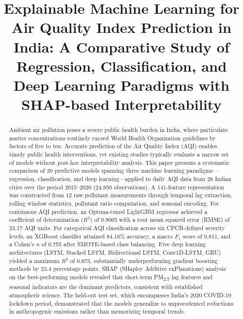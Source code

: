 \documentclass[conference]{IEEEtran}
\begin{document}
\title{Explainable Machine Learning for Air Quality Index Prediction in India: A Comparative Study of Regression, Classification, and Deep Learning Paradigms with SHAP-based Interpretability}

\author{
}

\maketitle

\begin{abstract}
Ambient air pollution poses a severe public health burden in India, where particulate matter concentrations routinely exceed World Health Organization guidelines by factors of five to ten. Accurate prediction of the Air Quality Index (AQI) enables timely public health interventions, yet existing studies typically evaluate a narrow set of models without post-hoc interpretability analysis. This paper presents a systematic comparison of 20 predictive models spanning three machine learning paradigms---regression, classification, and deep learning---applied to daily AQI data from 26 Indian cities over the period 2015--2020 (24,850 observations). A 141-feature representation was constructed from 12 raw pollutant measurements through temporal lag extraction, rolling window statistics, pollutant ratio computation, and seasonal encoding. For continuous AQI prediction, an Optuna-tuned LightGBM regressor achieved a coefficient of determination ($R^2$) of 0.9065 with a root mean squared error (RMSE) of 23.17 AQI units. For categorical AQI classification across six CPCB-defined severity levels, an XGBoost classifier attained 84.16\% accuracy, a macro $F_1$ score of 0.811, and a Cohen's $\kappa$ of 0.755 after SMOTE-based class balancing. Five deep learning architectures (LSTM, Stacked LSTM, Bidirectional LSTM, Conv1D-LSTM, GRU) yielded a maximum $R^2$ of 0.673, substantially underperforming gradient boosting methods by 23.4 percentage points. SHAP (SHapley Additive exPlanations) analysis on the best-performing models revealed that short-term PM\textsubscript{2.5} lag features and seasonal indicators are the dominant predictors, consistent with established atmospheric science. The held-out test set, which encompasses India's 2020 COVID-19 lockdown period, demonstrated that the models generalize to unprecedented reductions in anthropogenic emissions rather than memorizing temporal trends.
\end{abstract}
\end{document}
